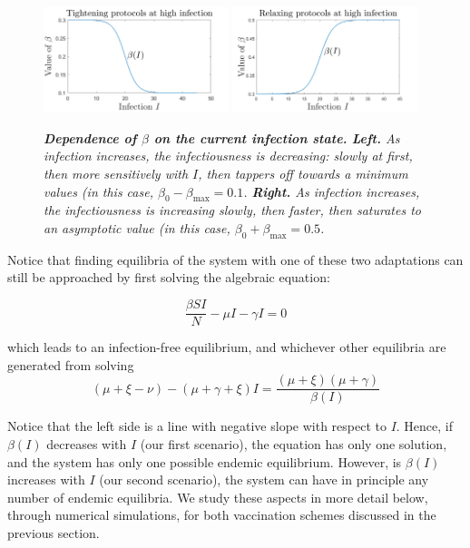 \documentclass[10pt]{article}
\begin{document}
\begin{figure}[h!]
\begin{center}
\includegraphics[width=0.48\textwidth]{figures/decreasing_sigm}
\includegraphics[width=0.48\textwidth]{figures/increasing_sigm}
\end{center}
\caption{\emph{{\bf Dependence of $\beta$ on the current infection state.} {\bf Left.} As infection increases, the infectiousness is decreasing: slowly at first, then more sensitively with $I$, then tappers off towards a minimum values (in this case, $\beta_0-\beta_{\max} = 0.1$. {\bf Right.} As infection increases, the infectiousness is increasing slowly, then faster, then saturates to an asymptotic value (in this case, $\beta_0+\beta_{\max} = 0.5$.}}
\label{sigmoidals}
\end{figure}

Notice that finding equilibria of the system with one of these two adaptations can still be approached by first solving the algebraic  equation: 

$$\frac{\beta SI}{N} - \mu I -\gamma I = 0$$

\noindent which leads to an infection-free equilibrium, and whichever other equilibria are generated from solving
\begin{equation*}
(\mu+\xi-\nu) -(\mu+\gamma+\xi)I = \frac{(\mu+\xi)(\mu+\gamma)}{\beta(I)}
\end{equation*}

Notice that the left side is a line with negative slope with respect to $I$. Hence, if $\beta(I)$ decreases with $I$ (our first scenario), the equation has only one solution, and the system has only one possible endemic equilibrium. However, is $\beta(I)$ increases with $I$ (our second scenario), the system can have in principle any number of endemic equilibria. We study  these aspects in more detail below, through numerical simulations, for both vaccination schemes discussed in the previous section.
\end{document}
